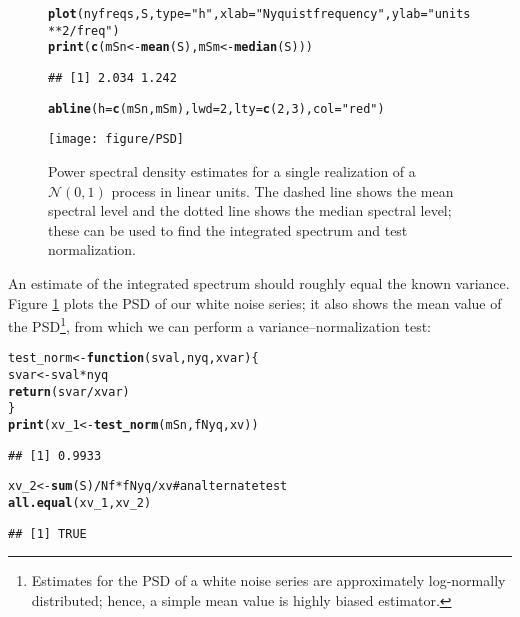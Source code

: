 \documentclass[12pt]{article}\usepackage{graphicx, color}
\makeatletter
\def\maxwidth{ %
  \ifdim\Gin@nat@width>\linewidth
    \linewidth
  \else
    \Gin@nat@width
  \fi
}
\newcommand{\hlfunctioncall}[1]{\textcolor[rgb]{0.501960784313725,0,0.329411764705882}{\textbf{#1}}}%
\newcommand{\hlstring}[1]{\textcolor[rgb]{0.6,0.6,1}{#1}}%
\newcommand{\hlcomment}[1]{\textcolor[rgb]{0.180392156862745,0.6,0.341176470588235}{#1}}%
\newenvironment{kframe}{%
 \def\at@end@of@kframe{}%
 \ifinner\ifhmode%
  \def\at@end@of@kframe{\end{minipage}}%
  \begin{minipage}{\columnwidth}%
 \fi\fi%
 \def\FrameCommand##1{\hskip\@totalleftmargin \hskip-\fboxsep
 \colorbox{shadecolor}{##1}\hskip-\fboxsep
     \hskip-\linewidth \hskip-\@totalleftmargin \hskip\columnwidth}%
 \MakeFramed {\advance\hsize-\width
   \@totalleftmargin\z@ \linewidth\hsize
   \@setminipage}}%
 {\par\unskip\endMakeFramed%
 \at@end@of@kframe}
\newenvironment{knitrout}{}{} %
\makeatother
\begin{document}
\begin{figure}[htb!]
\begin{center}
\begin{knitrout}
\color{fgcolor}\begin{kframe}
\begin{alltt}
\hlfunctioncall{plot}(nyfreqs, S, type = \hlstring{"h"}, xlab = \hlstring{"Nyquist frequency"}, ylab = \hlstring{"units**2 / freq"})
\hlfunctioncall{print}(\hlfunctioncall{c}(mSn <- \hlfunctioncall{mean}(S), mSm <- \hlfunctioncall{median}(S)))
\end{alltt}
\begin{verbatim}
## [1] 2.034 1.242
\end{verbatim}
\begin{alltt}
\hlfunctioncall{abline}(h = \hlfunctioncall{c}(mSn, mSm), lwd = 2, lty = \hlfunctioncall{c}(2, 3), col = \hlstring{"red"})
\end{alltt}
\end{kframe}
\texttt{[image: figure/PSD]} 

\end{knitrout}

\label{fig:psdN}
\caption{Power spectral density estimates for a single realization of a 
$\mathcal{N}(0,1)$ process in linear units.  
The dashed line shows the mean spectral level and the dotted line
shows the median spectral level; these can be
used to find the integrated spectrum and test normalization.}
\end{center}
\end{figure}

An estimate of the integrated spectrum
should roughly equal the known variance.
Figure \ref{fig:psdN} plots the PSD of our white noise series; it also shows
the mean value of the PSD\footnote{
Estimates for the PSD of a white noise series
are approximately log-normally distributed; hence,
a simple mean value is highly biased estimator.
}, from which we can perform a variance--normalization
test:
\begin{knitrout}
\color{fgcolor}\begin{kframe}
\begin{alltt}
test_norm <- \hlfunctioncall{function}(sval, nyq, xvar) \{
    svar <- sval * nyq
    \hlfunctioncall{return}(svar/xvar)
\}
\hlfunctioncall{print}(xv_1 <- \hlfunctioncall{test_norm}(mSn, fNyq, xv))
\end{alltt}
\begin{verbatim}
## [1] 0.9933
\end{verbatim}
\begin{alltt}
xv_2 <- \hlfunctioncall{sum}(S)/Nf * fNyq/xv  \hlcomment{# an alternate test}
\hlfunctioncall{all.equal}(xv_1, xv_2)
\end{alltt}
\begin{verbatim}
## [1] TRUE
\end{verbatim}
\end{kframe}
\end{knitrout}
\end{document}
